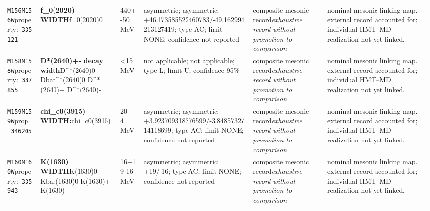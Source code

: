 \begin{landscape}
\begin{longtable}{L{1.85cm}L{4.45cm}L{2.35cm}L{4.05cm}L{3.35cm}L{7.15cm}}
\texttt{M156}\newline \texttt{M156W}\newline property:\ \texttt{335121} & \textbf{f\_\allowbreak{}0(2020) WIDTH}\newline f\_\allowbreak{}0(2020)0 & 440+-50\,MeV & asymmetric; asymmetric: +46.173585522460783/-49.162994213127419; type AC; limit NONE; confidence not reported & composite mesonic record\newline \emph{exhaustive record without promotion to comparison} & nominal mesonic linking map. external record accounted for; individual HMT--MD realization not yet linked. \\
\texttt{M158}\newline \texttt{M158W}\newline property:\ \texttt{337855} & \textbf{D*(2640)+- decay width}\newline D\textasciicircum{}*(2640)0 \textbar{}\allowbreak{} Dbar\textasciicircum{}*(2640)0 \textbar{}\allowbreak{} D\textasciicircum{}*(2640)+ \textbar{}\allowbreak{} D\textasciicircum{}*(2640)- & \textless{}15\,MeV & not applicable; not applicable; type L; limit U; confidence 95\% & composite mesonic record\newline \emph{exhaustive record without promotion to comparison} & nominal mesonic linking map. external record accounted for; individual HMT--MD realization not yet linked. \\
\texttt{M159}\newline \texttt{M159W}\newline prop.\ \texttt{346205} & \textbf{chi\_\allowbreak{}c0(3915) WIDTH:}\newline chi\_\allowbreak{}c0(3915) & 20+-4\,MeV & asymmetric; asymmetric: +3.923709318376599/-3.8485732714118699; type AC; limit NONE; confidence not reported & composite mesonic record\newline \emph{exhaustive record without promotion to comparison} & nominal mesonic linking map. external record accounted for; individual HMT--MD realization not yet linked. \\
\texttt{M160}\newline \texttt{M160W}\newline property:\ \texttt{335943} & \textbf{K(1630) WIDTH}\newline K(1630)0 \textbar{}\allowbreak{} Kbar(1630)0 \textbar{}\allowbreak{} K(1630)+ \textbar{}\allowbreak{} K(1630)- & 16+19-16\,MeV & asymmetric; asymmetric: +19/-16; type AC; limit NONE; confidence not reported & composite mesonic record\newline \emph{exhaustive record without promotion to comparison} & nominal mesonic linking map. external record accounted for; individual HMT--MD realization not yet linked. \\

\end{longtable}
\end{landscape}
